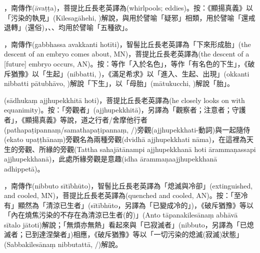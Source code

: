\startitemgroup[noteitems]
\item{}，南傳作(āvaṭṭa)，菩提比丘長老英譯為(whirlpools; eddies)。按：《顯揚真義》以「污染的執見」(Kilesagāhehi, )解說，與用於譬喻「疑邪」相類，用於譬喻「還戒退轉」(還俗)，、、均用於譬喻「五種欲」。
\stopitemgroup

\startitemgroup[noteitems]
\item{}，南傳作(gabbhassa avakkanti hotīti)，智髻比丘長老英譯為「下來形成胎」(the descent of an embryo comes about, MN)，菩提比丘長老英譯為(the descent of a [future] embryo occurs, AN)。按：等作「入於名色」，等作「有名色的下生」，《破斥猶豫》以「生起」(nibbatti, )，《滿足希求》以「進入、生起、出現」(okkanti nibbatti pātubhāvo, )解說「下生」，以「母胎」(mātukucchi, )解說「胎」。
\stopitemgroup

\startitemgroup[noteitems]
\item{}(sādhukaṃ ajjhupekkhitā hoti)，菩提比丘長老英譯為(he closely looks on with equanimity)。按：「旁觀者」(ajjhupekkhitā)，另譯為「觀察者；注意者；守護者」，《顯揚真義》等說，道之行者/舍摩他行者(pathapaṭipannaṃ/samathapaṭipannaṃ, /)旁觀(ajjhupekkhati-動詞)與一起隨侍(ekato upaṭṭhānaṃ)旁觀名為兩種旁觀(dvidhā ajjhupekkhati nāma)，在這裡為天生的旁觀、所緣的旁觀(Tattha sahajātānampi ajjhupekkhanā hoti ārammaṇassapi ajjhupekkhanā)，此處所緣旁觀是意趣(idha ārammaṇaajjhupekkhanā adhippetā)。
\stopitemgroup

\startitemgroup[noteitems]
\item{}，南傳作(nibbuto sītībhūto)，智髻比丘長老英譯為「熄滅與冷卻」(extinguished, and cooled, MN)，菩提比丘長老英譯為(quenched and cooled, AN)。按：「至冷有」顯然為「清涼已生者」(sītībhūto，另譯為「已變成冷的」)，《破斥猶豫》等以「內在燒焦污染的不存在為清涼已生者(的)」(Anto tāpanakilesānaṃ abhāvā sītalo jātoti)解說；「無煩亦無熱」看起來與「已寂滅者」(nibbuto，另譯為「已熄滅者；已到達涅槃者」)相應，《破斥猶豫》等以「一切污染的熄滅(寂滅)狀態」(Sabbakilesānaṃ nibbutattā, /)解說。
\stopitemgroup

